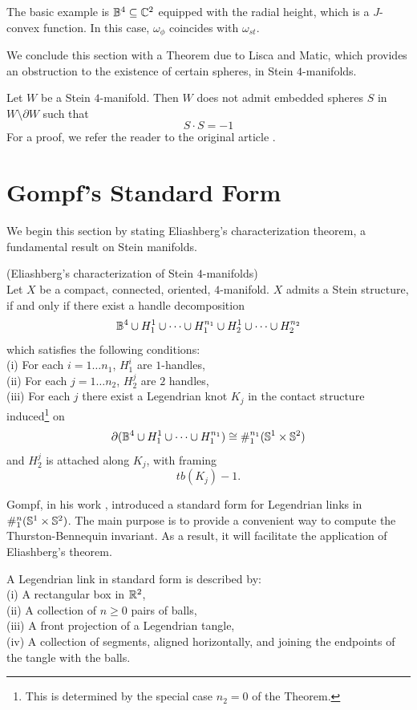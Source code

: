 \begin{ex} The basic example is $\mathbb{B}^4 \subseteq \mathbb{C}^2$ equipped with the radial height, which is a $J$-convex function. In this case, $\omega_{\phi}$ coincides with $\omega_{st}$.
\end{ex}
We conclude this section with a Theorem due to Lisca and Matic, which provides an obstruction to the existence of certain spheres, in Stein $4$-manifolds. 
\begin{prop}\label{ostruzione} 
Let $W$ be a Stein $4$-manifold. Then $W$ does not admit embedded spheres $S$ in $W \setminus \partial W$ such that $$
S \cdot S = -1
$$
For a proof, we refer the reader to the original article \cite{lisca-matic}.
\end{prop}
\section{Gompf's Standard Form}\label{gom}
We begin this section by stating Eliashberg's characterization theorem, a fundamental result on Stein manifolds.
\begin{thm}\label{el}(Eliashberg's characterization of Stein $4$-manifolds)\cite{eliashberg1990topological}\cite{gompf1998handlebody} \\
Let $X$ be a compact, connected, oriented, $4$-manifold. $X$ admits a Stein structure, if and only if there exist a handle decomposition $$
\mathbb{B}^4 \cup H_1^1 \cup \dots \cup H^{n_1}_1 \cup H_2^1 \cup \dots \cup H_2^{n_2}
$$which satisfies the following conditions: \\
(i) For each $i= 1 \dots n_1$, $H_1^i$ are $1$-handles, \\
(ii) For each $j= 1 \dots n_2$, $H_2^j$ are $2$ handles, \\
(iii) For each $j$ there exist a Legendrian knot $K_j$ in the contact structure induced\footnote{This is determined by the special case $n_2=0$ of the Theorem.} on $$
\partial(\mathbb{B}^4 \cup H_1^1 \cup \dots \cup H^{n_1}_1) \cong \#_1^{n_1}(\mathbb{S}^1 \times \mathbb{S}^2)
$$
and $H_2^j$ is attached along $K_j$, with framing $$
tb(K_j) - 1.
$$
\end{thm}
Gompf, in his work \cite{gompf1998handlebody}, introduced a standard form for Legendrian links in $\#_1^n(\mathbb{S}^1 \times \mathbb{S}^2)$. The main purpose is to provide a convenient way to compute the Thurston-Bennequin invariant. As a result, it will facilitate the application of Eliashberg's theorem.
\begin{defn}A Legendrian link in standard form is described by: \\
(i) A rectangular box in $\mathbb{R}^2$, \\
(ii) A collection of $n \geq0$ pairs of balls, \\
(iii) A front projection of a Legendrian tangle, \\
(iv) A collection of segments, aligned horizontally, and joining the endpoints of the tangle with the balls.
\end{defn}
